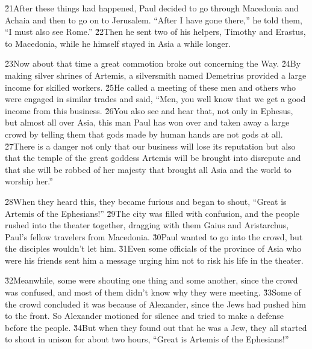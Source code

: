 \v{21}After these things had happened, Paul decided to go through Macedonia and Achaia and then to go on to Jerusalem. ``After I have gone there,'' he told them, ``I must also see Rome.'' \v{22}Then he sent two of his helpers, Timothy and Erastus, to Macedonia, while he himself stayed in Asia a while longer.

\v{23}Now about that time a great commotion broke out concerning the Way. \v{24}By making silver shrines of Artemis, a silversmith named Demetrius provided a large income for skilled workers. \v{25}He called a meeting of these men and others who were engaged in similar trades and said, ``Men, you well know that we get a good income from this business. \v{26}You also see and hear that, not only in Ephesus, but almost all over Asia, this man Paul has won over and taken away a large crowd by telling them that gods made by human hands are not gods at all. \v{27}There is a danger not only that our business will lose its reputation but also that the temple of the great goddess Artemis will be brought into disrepute and that she will be robbed of her majesty that brought all Asia and the world to worship her.''

\v{28}When they heard this, they became furious and began to shout, ``Great is Artemis of the Ephesians!'' \v{29}The city was filled with confusion, and the people rushed into the theater together, dragging with them Gaius and Aristarchus, Paul's fellow travelers from Macedonia. \v{30}Paul wanted to go into the crowd, but the disciples wouldn't let him. \v{31}Even some officials of the province of Asia who were his friends sent him a message urging him not to risk his life in the theater.

\v{32}Meanwhile, some were shouting one thing and some another, since the crowd was confused, and most of them didn't know why they were meeting. \v{33}Some of the crowd concluded it was because of Alexander, since the Jews had pushed him to the front. So Alexander motioned for silence and tried to make a defense before the people. \v{34}But when they found out that he was a Jew, they all started to shout in unison for about two hours, ``Great is Artemis of the Ephesians!''


